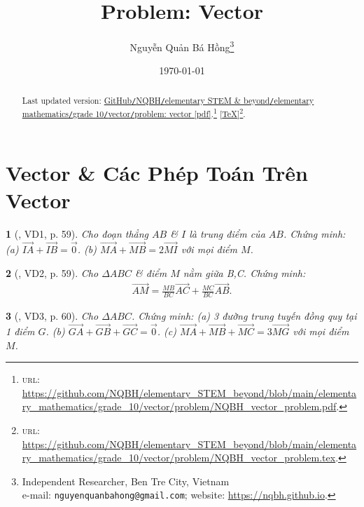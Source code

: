 \documentclass{article}
\title{Problem: Vector}
\author{Nguyễn Quản Bá Hồng\footnote{Independent Researcher, Ben Tre City, Vietnam\\e-mail: \texttt{nguyenquanbahong@gmail.com}; website: \url{https://nqbh.github.io}.}}
\date{\today}
\newtheorem{baitoan}{}
\begin{document}
\maketitle
\begin{abstract}
	Last updated version: \href{https://github.com/NQBH/elementary_STEM_beyond/blob/main/elementary_mathematics/grade_10/vector/problem/NQBH_vector_problem.pdf}{GitHub{\tt/}NQBH{\tt/}elementary STEM \& beyond{\tt/}elementary mathematics{\tt/}grade 10{\tt/}vector{\tt/}problem: vector [pdf]}.\footnote{\textsc{url}: \url{https://github.com/NQBH/elementary_STEM_beyond/blob/main/elementary_mathematics/grade_10/vector/problem/NQBH_vector_problem.pdf}.} [\href{https://github.com/NQBH/elementary_STEM_beyond/blob/main/elementary_mathematics/grade_10/vector/problem/NQBH_vector_problem.tex}{\TeX}]\footnote{\textsc{url}: \url{https://github.com/NQBH/elementary_STEM_beyond/blob/main/elementary_mathematics/grade_10/vector/problem/NQBH_vector_problem.tex}.}. 
\end{abstract}
\tableofcontents


\section{Vector \& Các Phép Toán Trên Vector}

\begin{baitoan}[\cite{Hai_Hung_Thu_Tung2022_tap_1}, VD1, p. 59]
	Cho đoạn thẳng $AB$ \& $I$ là trung điểm của $AB$. Chứng minh: (a) $\overrightarrow{IA} + \overrightarrow{IB} = \vec{0}$. (b)  $\overrightarrow{MA} + \overrightarrow{MB} = 2\overrightarrow{MI}$ với mọi điểm $M$.
\end{baitoan}

\begin{baitoan}[\cite{Hai_Hung_Thu_Tung2022_tap_1}, VD2, p. 59]
	Cho $\Delta ABC$ \& điểm $M$ nằm giữa B,C. Chứng minh:
	\begin{align*}
		\overrightarrow{AM} = \frac{MB}{BC}\overrightarrow{AC} + \frac{MC}{BC}\overrightarrow{AB}.
	\end{align*}
\end{baitoan}

\begin{baitoan}[\cite{Hai_Hung_Thu_Tung2022_tap_1}, VD3, p. 60]
	Cho $\Delta ABC$. Chứng minh: (a) 3 đường trung tuyến đồng quy tại 1 điểm $G$. (b) $\overrightarrow{GA} + \overrightarrow{GB} + \overrightarrow{GC} = \vec{0}$. (c) $\overrightarrow{MA} + \overrightarrow{MB} + \overrightarrow{MC} = 3\overrightarrow{MG}$ với mọi điểm $M$.
\end{baitoan}
\end{document}
